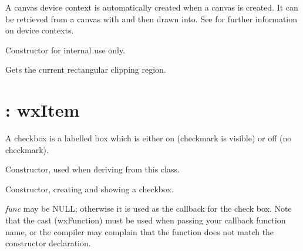 A canvas device context is automatically created when a canvas is created.
It can be retrieved from a canvas with  and then
drawn into. See  for further information on device contexts.



Constructor for internal use only.



Gets the current rectangular clipping region.

\section{: wxItem}\label{wxcheckbox}

A checkbox is a labelled box which is either on (checkmark is visible)
or off (no checkmark).

\label{constrcheckbox}


Constructor, used when deriving from this class.



Constructor, creating and showing a checkbox.

{\it func} may be NULL; otherwise it is used as the callback for the
check box.  Note that the cast (wxFunction) must be used when passing
your callback function name, or the compiler may complain that the
function does not match the constructor declaration.

